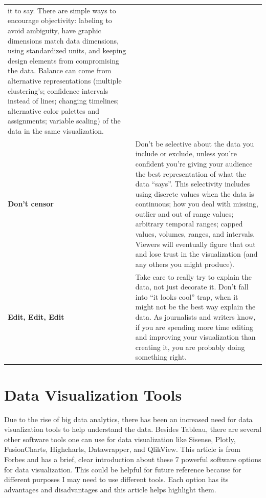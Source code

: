 \documentclass[]{book}
\theoremstyle{definition}
\theoremstyle{definition}
\theoremstyle{definition}
\theoremstyle{remark}
\begin{document}
\begin{longtable}[]{@{}ll@{}}
\begin{minipage}[t]{0.75\columnwidth}
it to say. There are simple ways to encourage objectivity: labeling to
avoid ambiguity, have graphic dimensions match data dimensions, using
standardized units, and keeping design elements from compromising the
data. Balance can come from alternative representations (multiple
clustering's; confidence intervals instead of lines; changing timelines;
alternative color palettes and assignments; variable scaling) of the
data in the same visualization.\strut
\end{minipage}\tabularnewline
\begin{minipage}[t]{0.19\columnwidth}\raggedright\strut
\textbf{Don't censor}\strut
\end{minipage} & \begin{minipage}[t]{0.75\columnwidth}\raggedright\strut
Don't be selective about the data you include or exclude, unless you're
confident you're giving your audience the best representation of what
the data ``says''. This selectivity includes using discrete values when
the data is continuous; how you deal with missing, outlier and out of
range values; arbitrary temporal ranges; capped values, volumes, ranges,
and intervals. Viewers will eventually figure that out and lose trust in
the visualization (and any others you might produce).\strut
\end{minipage}\tabularnewline
\begin{minipage}[t]{0.19\columnwidth}\raggedright\strut
\textbf{Edit, Edit, Edit}\strut
\end{minipage} & \begin{minipage}[t]{0.75\columnwidth}\raggedright\strut
Take care to really try to explain the data, not just decorate it. Don't
fall into ``it looks cool'' trap, when it might not be the best way
explain the data. As journalists and writers know, if you are spending
more time editing and improving your visualization than creating it, you
are probably doing something right.\strut
\end{minipage}\tabularnewline
\bottomrule
\end{longtable}

\section{Data Visualization Tools}\label{data-visualization-tools}

Due to the rise of big data analytics, there has been an increased need
for data visualization tools to help understand the data. Besides
Tableau, there are several other software tools one can use for data
visualization like Sisense, Plotly, FusionCharts, Highcharts,
Datawrapper, and QlikView. This article is from Forbes and has a brief,
clear introduction about these 7 powerful software options for data
visualization. This could be helpful for future reference because for
different purposes I may need to use different tools. Each option has
its advantages and disadvantages and this article helps highlight them.
\end{document}
